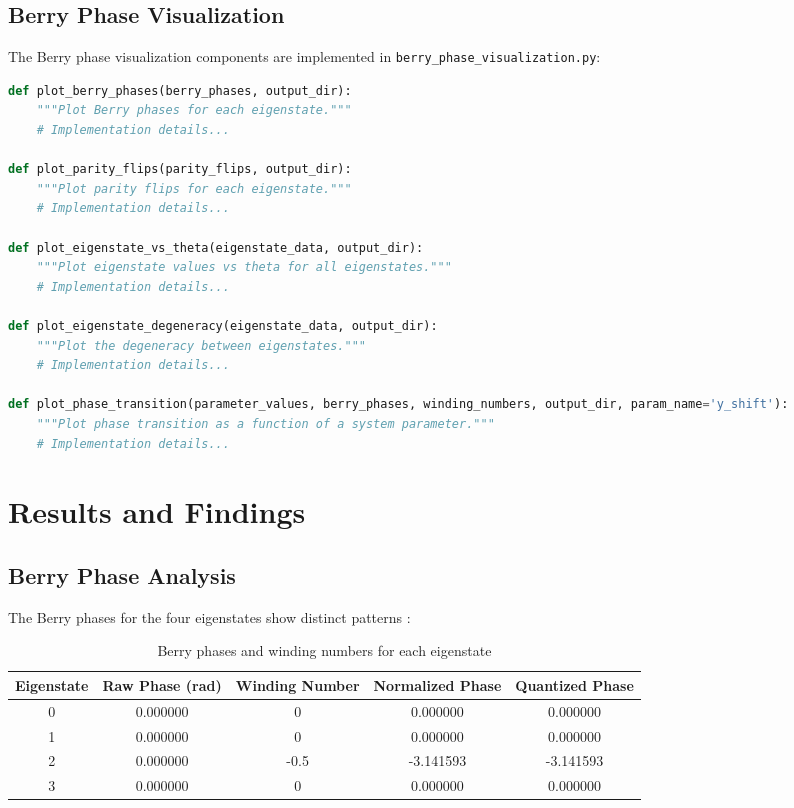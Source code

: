\documentclass{article}
\begin{document}
\subsection{Berry Phase Visualization}

The Berry phase visualization components are implemented in \texttt{berry\_phase\_visualization.py}:

\begin{lstlisting}[language=Python, caption=Key visualization functions]
def plot_berry_phases(berry_phases, output_dir):
    """Plot Berry phases for each eigenstate."""
    # Implementation details...

def plot_parity_flips(parity_flips, output_dir):
    """Plot parity flips for each eigenstate."""
    # Implementation details...

def plot_eigenstate_vs_theta(eigenstate_data, output_dir):
    """Plot eigenstate values vs theta for all eigenstates."""
    # Implementation details...

def plot_eigenstate_degeneracy(eigenstate_data, output_dir):
    """Plot the degeneracy between eigenstates."""
    # Implementation details...

def plot_phase_transition(parameter_values, berry_phases, winding_numbers, output_dir, param_name='y_shift'):
    """Plot phase transition as a function of a system parameter."""
    # Implementation details...
\end{lstlisting}

\section{Results and Findings}

\subsection{Berry Phase Analysis}

The Berry phases for the four eigenstates show distinct patterns \cite{Xiao2010, Vanderbilt2018}:

\begin{table}[H]
\centering
\begin{tabular}{|c|c|c|c|c|}
\hline
Eigenstate & Raw Phase (rad) & Winding Number & Normalized Phase & Quantized Phase \\
\hline
0 & 0.000000 & 0 & 0.000000 & 0.000000 \\
1 & 0.000000 & 0 & 0.000000 & 0.000000 \\
2 & 0.000000 & -0.5 & -3.141593 & -3.141593 \\
3 & 0.000000 & 0 & 0.000000 & 0.000000 \\
\hline
\end{tabular}
\caption{Berry phases and winding numbers for each eigenstate}
\end{table}
\end{document}
